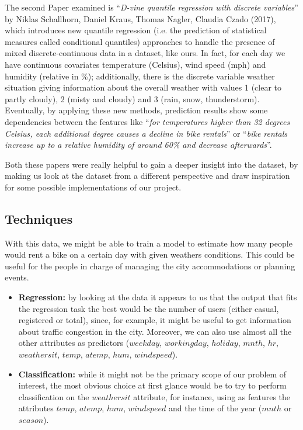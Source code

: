 \documentclass[11pt,a4paper]{article}
\begin{document}
The second Paper examined is “\textit{D-vine quantile regression with discrete variables}” by Niklas Schallhorn, Daniel Kraus, Thomas Nagler, Claudia Czado (2017), which introduces new quantile regression (i.e. the prediction of statistical measures called conditional quantiles) approaches to handle the presence of mixed discrete-continuous data in a dataset, like ours. In fact, for each day we have continuous covariates temperature (Celsius), wind speed (mph) and humidity (relative in \%); additionally, there is the discrete variable weather situation giving information about the overall weather with values 1 (clear to partly cloudy), 2 (misty and cloudy) and 3 (rain, snow, thunderstorm). Eventually, by applying these new methods, prediction results show some dependencies between the features like “\textit{for temperatures higher than 32 degrees Celsius, each additional degree causes a decline in bike rentals}” or “\textit{bike rentals increase up to a relative humidity of around 60\% and decrease afterwards}”. 

Both these papers were really helpful to gain a deeper insight into the dataset, by making us look at the dataset from a different perspective and draw inspiration for some possible implementations of our project. \\

\subsection{Techniques}
With this data, we might be able to train a model to estimate how many people would rent a bike on a certain day with given weathers conditions. This could be useful for the people in charge of managing the city accommodations or planning events.

\begin{itemize}

\item \textbf{Regression:} by looking at the data it appears to us that the output that fits the regression task the best would be the number of users (either casual, registered or total), since, for example, it might be useful to get information about traffic congestion in the city. Moreover, we can also use almost all the other attributes as predictors ($weekday$, $workingday$, $holiday$, $mnth$, $hr$, $weathersit$, $temp$, $atemp$, $hum$, $windspeed$). 

\item \textbf{Classification:} while it might not be the primary scope of our problem of interest, the most obvious choice at first glance would be to try to perform classification on the $weathersit$ attribute, for instance, using as features the attributes $temp$, $atemp$, $hum$, $windspeed$ and the time of the year ($mnth$ or $season$). 

 
\end{itemize}
\end{document}
